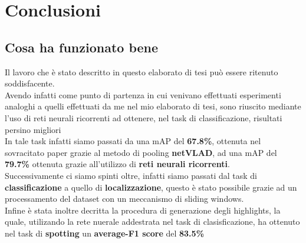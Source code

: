 \chapter{Conclusioni}\label{ch:conclusioni}
\section{Cosa ha funzionato bene}
Il lavoro che è stato descritto in questo elaborato di tesi può essere ritenuto soddisfacente.
\\Avendo infatti come punto di partenza \cite{soccerNet} in cui venivano effettuati esperimenti analoghi a quelli effettuati da me nel mio elaborato di tesi, sono riuscito mediante l'uso di reti neurali ricorrenti ad ottenere, nel task di classificazione, risultati persino migliori
\\In tale task infatti siamo passati da una mAP del\textbf{ 67.8\%}, ottenuta nel sovracitato paper grazie al metodo di pooling \textbf{netVLAD}, ad una mAP del \textbf{79.7\%} ottenuta grazie all'utilizzo di \textbf{reti neurali ricorrenti}.
\\Successivamente ci siamo spinti oltre, infatti siamo passati dal task di \textbf{classificazione} a quello di \textbf{localizzazione}, questo è stato possibile grazie ad un processamento del dataset con un meccanismo di sliding windows.
\\Infine è stata inoltre decritta la procedura di generazione degli highlights, la quale, utilizando la rete nuerale addestrata nel task di clasisficazione, ha ottenuto nel task di \textbf{spotting} un \textbf{average-F1 score} del \textbf{83.5\%}
